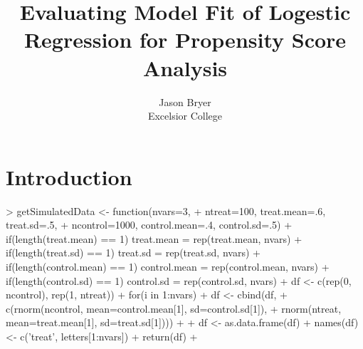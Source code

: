 \documentclass{Z}
\author{Jason Bryer\\Excelsior College}
\title{Evaluating Model Fit of Logestic Regression for Propensity Score Analysis}
\begin{document}
\section{Introduction} \label{sec:intro}



\begin{Schunk}
\begin{Sinput}
> getSimulatedData <- function(nvars=3,
+     ntreat=100, treat.mean=.6, treat.sd=.5,
+     ncontrol=1000, control.mean=.4, control.sd=.5) {
+   if(length(treat.mean) == 1) { treat.mean = rep(treat.mean, nvars) }
+   if(length(treat.sd) == 1) { treat.sd = rep(treat.sd, nvars) }
+   if(length(control.mean) == 1) { control.mean = rep(control.mean, nvars) }
+   if(length(control.sd) == 1) { control.sd = rep(control.sd, nvars) }	
+   df <- c(rep(0, ncontrol), rep(1, ntreat))
+   for(i in 1:nvars) {
+     df <- cbind(df, 
+                 c(rnorm(ncontrol, mean=control.mean[1], sd=control.sd[1]),
+                   rnorm(ntreat, mean=treat.mean[1], sd=treat.sd[1])))
+   }
+   df <- as.data.frame(df)
+   names(df) <- c('treat', letters[1:nvars])
+   return(df)
+ }
\end{Sinput}
\end{Schunk}
\end{document}
